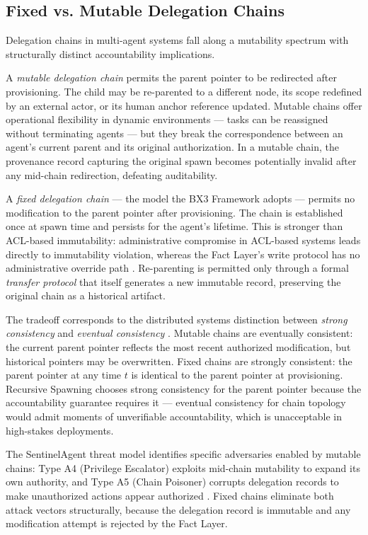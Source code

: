 \subsection{Fixed vs. Mutable Delegation Chains}
\label{sec:delegation-chains}

Delegation chains in multi-agent systems fall along a mutability spectrum with structurally distinct accountability implications.

A \emph{mutable delegation chain} permits the parent pointer to be redirected after provisioning. The child may be re-parented to a different node, its scope redefined by an external actor, or its human anchor reference updated. Mutable chains offer operational flexibility in dynamic environments — tasks can be reassigned without terminating agents — but they break the correspondence between an agent's current parent and its original authorization. In a mutable chain, the provenance record capturing the original spawn becomes potentially invalid after any mid-chain redirection, defeating auditability.

A \emph{fixed delegation chain} — the model the BX3 Framework adopts — permits no modification to the parent pointer after provisioning. The chain is established once at spawn time and persists for the agent's lifetime. This is stronger than ACL-based immutability: administrative compromise in ACL-based systems leads directly to immutability violation, whereas the Fact Layer's write protocol has no administrative override path \cite{bx3framework2026}. Re-parenting is permitted only through a formal \emph{transfer protocol} that itself generates a new immutable record, preserving the original chain as a historical artifact.

The tradeoff corresponds to the distributed systems distinction between \emph{strong consistency} and \emph{eventual consistency} \cite{vogels2009eventual}. Mutable chains are eventually consistent: the current parent pointer reflects the most recent authorized modification, but historical pointers may be overwritten. Fixed chains are strongly consistent: the parent pointer at any time $t$ is identical to the parent pointer at provisioning. Recursive Spawning chooses strong consistency for the parent pointer because the accountability guarantee requires it — eventual consistency for chain topology would admit moments of unverifiable accountability, which is unacceptable in high-stakes deployments.

The SentinelAgent threat model identifies specific adversaries enabled by mutable chains: Type A4 (Privilege Escalator) exploits mid-chain mutability to expand its own authority, and Type A5 (Chain Poisoner) corrupts delegation records to make unauthorized actions appear authorized \cite[Table I]{sentinel_agent_2026}. Fixed chains eliminate both attack vectors structurally, because the delegation record is immutable and any modification attempt is rejected by the Fact Layer.

